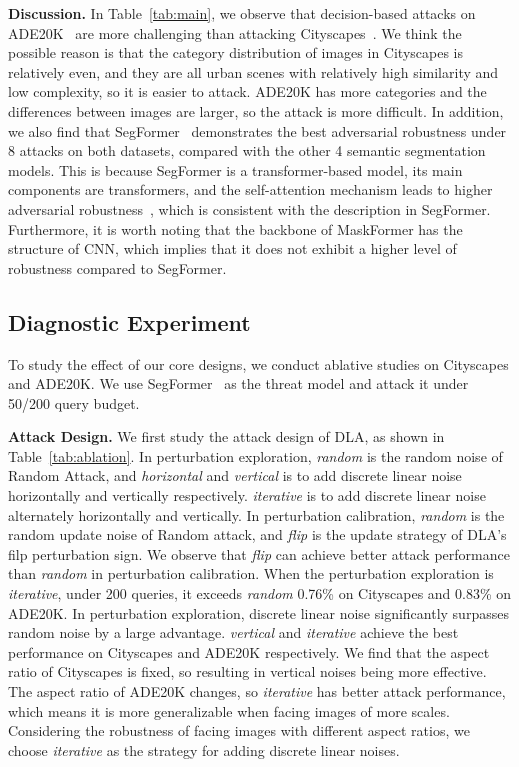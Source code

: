 \documentclass[10pt,twocolumn,letterpaper]{article}
\begin{document}
\noindent\textbf{Discussion.}
In Table~\ref{tab:main}, we observe that decision-based attacks on ADE20K~\cite{ade20k} are more challenging than attacking Cityscapes~\cite{cityscapes}. We think the possible reason is that the category distribution of images in Cityscapes is relatively even, and they are all urban scenes with relatively high similarity and low complexity, so it is easier to attack. ADE20K has more categories and the differences between images are larger, so the attack is more difficult. In addition, we also find that SegFormer~\cite{segformer} demonstrates the best adversarial robustness under 8 attacks on both datasets, compared with the other 4 semantic segmentation models. This is because SegFormer is a transformer-based model, its main components are transformers, and the self-attention mechanism leads to higher adversarial robustness~\cite{devopatch,shao2022adversarial}, which is consistent with the description in SegFormer. Furthermore, it is worth noting that the backbone of MaskFormer has the structure of CNN, which implies that it does not exhibit a higher level of robustness compared to SegFormer.


\subsection{Diagnostic Experiment}
To study the effect of our core designs, we conduct ablative studies on Cityscapes and ADE20K. We use SegFormer~\cite{segformer} as the threat model and attack it under 50/200 query budget.

\noindent\textbf{Attack Design.}
We first study the attack design of DLA, as shown in Table~\ref{tab:ablation}. In perturbation exploration, \textit{random} is the random noise of Random Attack, and \textit{horizontal} and \textit{vertical} is to add discrete linear noise horizontally and vertically respectively. \textit{iterative} is to add discrete linear noise alternately horizontally and vertically. In perturbation calibration, \textit{random} is the random update noise of Random attack, and \textit{flip} is the update strategy of DLA's filp perturbation sign. We observe that \textit{flip} can achieve better attack performance than \textit{random} in perturbation calibration. When the perturbation exploration is \textit{iterative}, under 200 queries, it exceeds \textit{random} 0.76\% on Cityscapes and 0.83\% on ADE20K. In perturbation exploration, discrete linear noise significantly surpasses random noise by a large advantage. \textit{vertical} and \textit{iterative} achieve the best performance on Cityscapes and ADE20K respectively. We find that the aspect ratio of Cityscapes is fixed, so resulting in vertical noises being more effective. The aspect ratio of ADE20K changes, so \textit{iterative} has better attack performance, which means it is more generalizable when facing images of more scales. Considering the robustness of facing images with different aspect ratios, we choose \textit{iterative} as the strategy for adding discrete linear noises.
\end{document}
